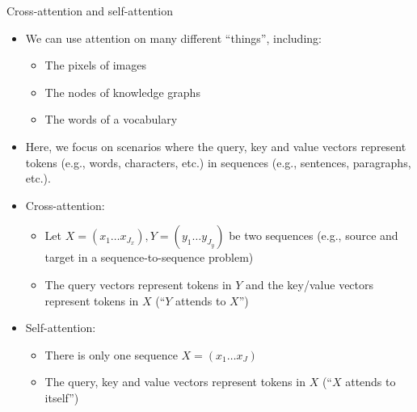
\begin{vbframe}{Cross-attention and self-attention}

\vskip-3mm
\vfill

\begin{itemize}
	\item We can use attention on many different ``things'', including: 
		\begin{itemize}
			\item The pixels of images
			\item The nodes of knowledge graphs
			\item The words of a vocabulary
		\end{itemize}
	\item Here, we focus on scenarios where the query, key and value vectors represent tokens (e.g., words, characters, etc.) in sequences (e.g., sentences, paragraphs, etc.).
	\item Cross-attention:
		\begin{itemize}
			\item Let $X = (x_1 \ldots x_{J_x}), Y = (y_1 \ldots y_{J_y})$ be two sequences (e.g., source and target in a sequence-to-sequence problem)
			\item The query vectors represent tokens in $Y$ and the key/value vectors represent tokens in $X$ (``$Y$ attends to $X$'')
		\end{itemize}
	\item Self-attention:
		\begin{itemize}
			\item There is only one sequence $X = (x_1 \ldots x_J)$
			\item The query, key and value vectors represent tokens in $X$ (``$X$ attends to itself'')
		\end{itemize}
\end{itemize}

\vfill

\end{vbframe}


